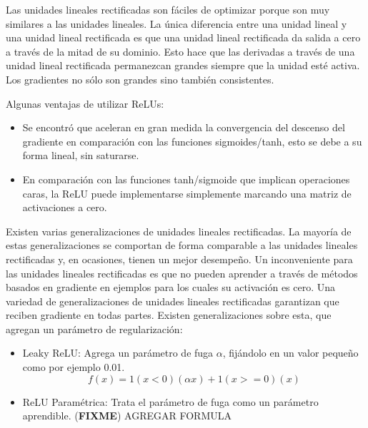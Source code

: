 \documentclass[a4paper,11pt,spanish]{book}
\newcommand*{\FIXME}[1]{{(\textbf{FIXME}) {#1}}}
\begin{document}
	    Las unidades lineales rectificadas son fáciles de optimizar porque son muy similares a las unidades lineales.
	    La única diferencia entre una unidad lineal y una unidad lineal rectificada es que una unidad lineal rectificada da salida a cero a través de la mitad de su dominio.
	    Esto hace que las derivadas a través de una unidad lineal rectificada permanezcan grandes siempre que la unidad esté activa.
	    Los gradientes no sólo son grandes sino también consistentes.

	    Algunas ventajas de utilizar ReLUs:
	    \begin{itemize}
	      \item Se encontró que aceleran en gran medida la convergencia del descenso del gradiente en comparación con las funciones sigmoides/tanh, esto se debe a su forma lineal, sin saturarse.
	      \item En comparación con las funciones tanh/sigmoide que implican operaciones caras, la ReLU puede implementarse simplemente marcando una matriz de activaciones a cero.
	    \end{itemize}

	    Existen varias generalizaciones de unidades lineales rectificadas. La mayoría de estas generalizaciones se comportan de forma comparable a las unidades lineales rectificadas
	    y, en ocasiones, tienen un mejor desempeño. Un inconveniente para las unidades lineales rectificadas es que no pueden aprender a través de métodos basados ​​en
	    gradiente en ejemplos para los cuales su activación es cero. Una variedad de generalizaciones de unidades lineales rectificadas garantizan que reciben gradiente en
	    todas partes. Existen generalizaciones sobre esta, que agregan un parámetro de regularización:
	    \begin{itemize}
	      \item Leaky ReLU: Agrega un parámetro de fuga $\alpha$, fijándolo en un valor pequeño como por ejemplo 0.01.
		\begin{equation}
		  f(x)=1(x<0)(\alpha x)+1(x>=0)(x)
		\end{equation}
	      \item ReLU Paramétrica: Trata el parámetro de fuga como un parámetro aprendible. \FIXME{AGREGAR FORMULA}
	    \end{itemize}
\end{document}
